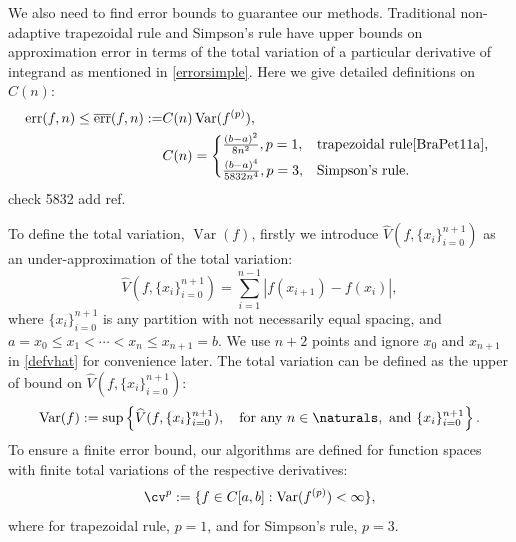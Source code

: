 \documentclass{iitthesis}
\DeclareMathOperator{\Var}{Var}
\theoremstyle{definition}
\theoremstyle{remark}
\begin{document}
We also need to find error bounds to guarantee our methods. Traditional non-adaptive trapezoidal rule and Simpson's rule have upper bounds on approximation error in terms of the total variation of a particular derivative of integrand as mentioned in \eqref{errorsimple}. Here we give detailed definitions on $C(n)$:
\begin{align}\label{errorbound}
    \text{err}(f,n)\le\overline{\text{err}}(f,n):=&C(n)\Var(f^{(p)}),\\
    \nonumber&C(n)=
    \begin{cases*}
           \frac{(b-a)^2}{8n^2}, p=1,  & \mbox{trapezoidal rule}\cite[(7.15)]{BraPet11a}, \\
           \frac{(b-a)^4}{5832n^4}, p=3, & \mbox{Simpson's rule}.
    \end{cases*}
\end{align}
check 5832 add ref.

To define the total variation, $\Var(f)$, firstly we introduce $\widehat{V}(f,\{x_i\}_{i=0}^{n+1})$ as an under-approximation of the total variation:
\begin{equation}\label{defvhat}
    \widehat{V}(f,\{x_i\}_{i=0}^{n+1})=\sum_{i=1}^{n-1}|f(x_{i+1})-f(x_{i})|,
\end{equation}
where $\{x_i\}_{i=0}^{n+1}$ is any partition with not necessarily equal spacing, and $a=x_{0}\leq x_{1}<\cdots<x_{n}\leq x_{n+1}=b$.
We use $n+2$ points and ignore $x_0$ and $x_{n+1}$ in \eqref{defvhat} for convenience later.
The total variation can be defined as the upper of bound on $\widehat{V}(f,\{x_i\}_{i=0}^{n+1})$:
\begin{equation}\label{defvar}
  \Var(f) := \sup \left\{\widehat{V}(f,\{x_i\}_{i=0}^{n+1}), \quad \text{for any }n \in \naturals, \text{ and } \{x_i\}_{i=0}^{n+1}\right\}.
\end{equation}
To ensure a finite error bound, our algorithms are defined for function spaces with finite total variations of the respective derivatives:
\begin{equation}\label{defspace}
 \cv^{p}:=\{f\in C[a,b]: \Var(f^{(p)}) < \infty \},
\end{equation}
where for trapezoidal rule, $p=1$, and for Simpson's rule, $p=3$.
\end{document}
